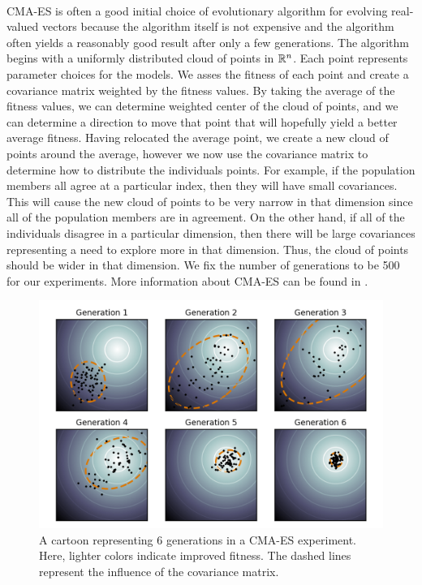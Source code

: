 \\
CMA-ES is often a good initial choice of evolutionary algorithm for evolving real-valued vectors because the algorithm itself is not expensive and the algorithm often yields a reasonably good result after only a few generations. The algorithm begins with a uniformly distributed cloud of points in $\mathbb{R}^{n}$. Each point represents parameter choices for the models. We asses the fitness of each point and create a covariance matrix weighted by the fitness values. By taking the average of the fitness values, we can determine weighted center of the cloud of points, and we can determine a direction to move that point that will hopefully yield a better average fitness. Having relocated the average point, we create a new cloud of points around the average, however we now use the covariance matrix to determine how to distribute the individuals points. For example, if the population members all agree at a particular index, then they will have small covariances. This will cause the new cloud of points to be very narrow in that dimension since all of the population members are in agreement. On the other hand, if all of the individuals disagree in a particular dimension, then there will be large covariances representing a need to explore more in that dimension. Thus, the cloud of points should be wider in that dimension. We fix the number of generations to be 500 for our experiments. More information about CMA-ES can be found in \cite{suttorp}.

\begin{figure}[tpb!]
\centering
  \includegraphics[width=.48\textwidth]{figures/cmaes.png}
  \caption{
    A cartoon representing 6 generations in a CMA-ES experiment. Here, lighter colors indicate improved fitness. The dashed lines represent the influence of the covariance matrix.\\
    }
  \label{fig:cmaes}
\end{figure}


